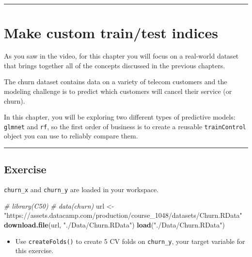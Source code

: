 \documentclass[
]{book}
\newenvironment{Shaded}{\begin{snugshade}}{\end{snugshade}}
\newcommand{\CommentTok}[1]{\textcolor[rgb]{0.56,0.35,0.01}{\textit{#1}}}
\newcommand{\KeywordTok}[1]{\textcolor[rgb]{0.13,0.29,0.53}{\textbf{#1}}}
\newcommand{\NormalTok}[1]{#1}
\newcommand{\StringTok}[1]{\textcolor[rgb]{0.31,0.60,0.02}{#1}}
\providecommand{\tightlist}{%
  \setlength{\itemsep}{0pt}\setlength{\parskip}{0pt}}
\begin{document}
\begin{center}\rule{0.5\linewidth}{0.5pt}\end{center}

\hypertarget{make-custom-traintest-indices}{%
\section{Make custom train/test indices}\label{make-custom-traintest-indices}}

As you saw in the video, for this chapter you will focus on a real-world dataset that brings together all of the concepts discussed in the previous chapters.

The churn dataset contains data on a variety of telecom customers and the modeling challenge is to predict which customers will cancel their service (or churn).

In this chapter, you will be exploring two different types of predictive models: \texttt{glmnet} and \texttt{rf}, so the first order of business is to create a reusable \texttt{trainControl} object you can use to reliably compare them.

\begin{center}\rule{0.5\linewidth}{0.5pt}\end{center}

\hypertarget{exercise-29}{%
\subsection*{Exercise}\label{exercise-29}}

\texttt{churn\_x} and \texttt{churn\_y} are loaded in your workspace.

\begin{Shaded}
\begin{Highlighting}[]
\CommentTok{# library(C50)}
\CommentTok{# data(churn)}
\NormalTok{url <-}\StringTok{ "https://assets.datacamp.com/production/course_1048/datasets/Churn.RData"}
\KeywordTok{download.file}\NormalTok{(url, }\StringTok{"./Data/Churn.RData"}\NormalTok{)}
\KeywordTok{load}\NormalTok{(}\StringTok{"./Data/Churn.RData"}\NormalTok{)}
\end{Highlighting}
\end{Shaded}

\begin{itemize}
\tightlist
\item
  Use \texttt{createFolds()} to create 5 CV folds on \texttt{churn\_y}, your target variable for this exercise.
\end{itemize}
\end{document}
